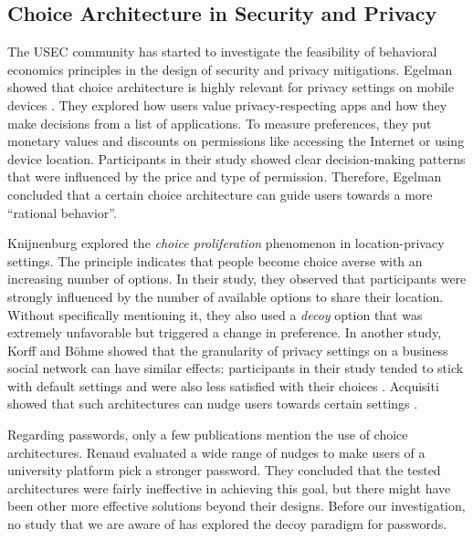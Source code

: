 \subsection{Choice Architecture in Security and Privacy}
The \gls{USEC} community has started to investigate the feasibility of behavioral economics principles in the design of security and privacy mitigations. Egelman \etal showed that choice architecture is highly relevant for privacy settings on mobile devices \cite{Egelman2013ChoiceArchitecture}. They explored how users value privacy-respecting apps and how they make decisions from a list of applications. To measure preferences, they put monetary values and discounts on permissions like accessing the Internet or using device location. Participants in their study showed clear decision-making patterns that were influenced by the price and type of permission. Therefore, Egelman \etal concluded that a certain choice architecture can guide users towards a more ``rational behavior''. 

Knijnenburg \etal \cite{Knijnenburg2013MorePrivacyOptions} explored the \textit{choice proliferation} phenomenon in location-privacy settings. The principle indicates that people become choice averse with an increasing number of options. In their study, they observed that participants were strongly influenced by the number of available options to share their location. Without specifically mentioning it, they also used a \textit{decoy} option that was extremely unfavorable but triggered a change in preference. In another study, Korff and Böhme showed that the granularity of privacy settings on a business social network can have similar effects: participants in their study tended to stick with default settings and were also less satisfied with their choices \cite{Korff2014TooMuchChoice}. Acquisiti \etal showed that such architectures can nudge users towards certain settings \cite{Acquisti2017NudgesPrivacySecurity}. 

Regarding passwords, only a few publications mention the use of choice architectures. Renaud \etal evaluated a wide range of nudges to make users of a university platform pick a stronger password. They concluded that the tested architectures were fairly ineffective in achieving this goal, but there might have been other more effective solutions beyond their designs. Before our investigation, no study that we are aware of has explored the decoy paradigm for passwords. 


